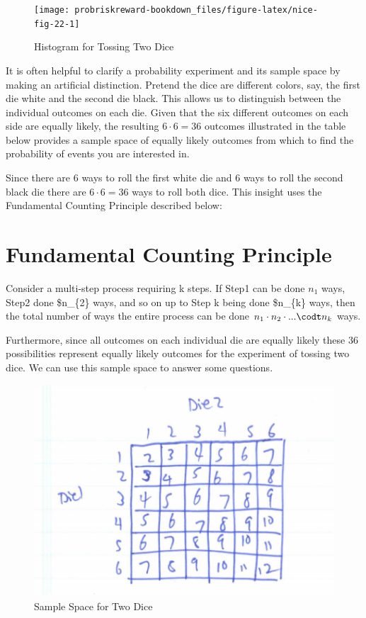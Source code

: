 \documentclass[]{book}
\theoremstyle{definition}
\theoremstyle{definition}
\theoremstyle{definition}
\theoremstyle{remark}
\begin{document}
\begin{figure}

{\centering \texttt{[image: probriskreward-bookdown\_files/figure-latex/nice-fig-22-1]} 

}

\caption{Histogram for Tossing Two Dice}\label{fig:nice-fig-22}
\end{figure}

It is often helpful to clarify a probability experiment and its sample
space by making an artificial distinction. Pretend the dice are
different colors, say, the first die white and the second die black.
This allows us to distinguish between the individual outcomes on each
die. Given that the six different outcomes on each side are equally
likely, the resulting \(6 \cdot 6 = 36\) outcomes illustrated in the
table below provides a sample space of equally likely outcomes from
which to find the probability of events you are interested in.

Since there are 6 ways to roll the first white die and 6 ways to roll
the second black die there are \(6 \cdot 6 = 36\) ways to roll both
dice. This insight uses the Fundamental Counting Principle described
below:

\section{Fundamental Counting
Principle}\label{fundamental_counting_principle}

Consider a multi-step process requiring k steps. If Step1 can be done
\(n_{1}\) ways, Step2 done \$n\_\{2\} ways, and so on up to Step k being
done \$n\_\{k\} ways, then the total number of ways the entire process
can be done \(n_{1} \cdot n_{2} \cdot ... \codt n_{k}\) ways.

Furthermore, since all outcomes on each individual die are equally
likely these 36 possibilities represent equally likely outcomes for the
experiment of tossing two dice. We can use this sample space to answer
some questions.

\begin{figure}

{\centering \includegraphics[width=0.3\linewidth]{01-basics-figures/two_dice_sample_space} 

}

\caption{Sample Space for Two Dice}\label{fig:nice-fig-23}
\end{figure}
\end{document}
